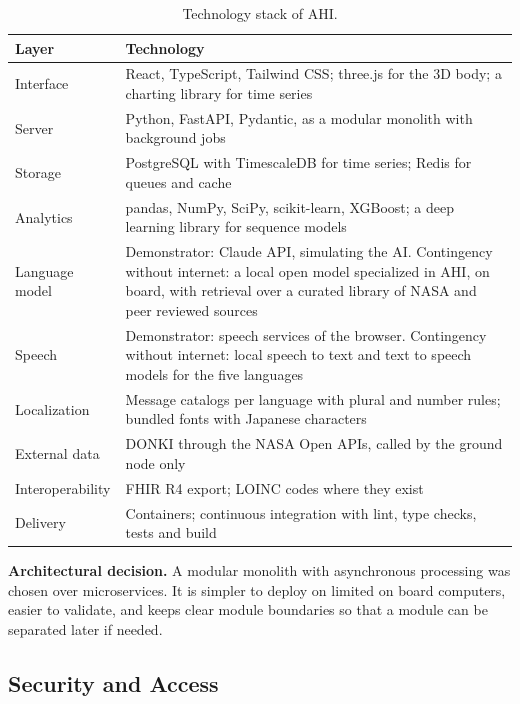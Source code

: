 \begin{table}[htbp]
\centering
\vspace{0.8em}
\caption{Technology stack of AHI.}
\label{tab:stack}
\small
\begin{tabular}{p{3.4cm}p{10.6cm}}
\hline
\textbf{Layer} & \textbf{Technology} \\
\hline
Interface & React, TypeScript, Tailwind CSS; three.js for the 3D body; a charting library for time series \\
Server & Python, FastAPI, Pydantic, as a modular monolith with background jobs \\
Storage & PostgreSQL with TimescaleDB for time series; Redis for queues and cache \\
Analytics & pandas, NumPy, SciPy, scikit-learn, XGBoost; a deep learning library for sequence models \\
Language model & Demonstrator: Claude API, simulating the AI. Contingency without internet: a local open model specialized in AHI, on board, with retrieval over a curated library of NASA and peer reviewed sources \\
Speech & Demonstrator: speech services of the browser. Contingency without internet: local speech to text and text to speech models for the five languages \\
Localization & Message catalogs per language with plural and number rules; bundled fonts with Japanese characters \\
External data & DONKI through the NASA Open APIs, called by the ground node only \\
Interoperability & FHIR R4 export; LOINC codes where they exist \\
Delivery & Containers; continuous integration with lint, type checks, tests and build \\
\hline
\end{tabular}
\vspace{1.2em}
\end{table}

\medskip\noindent\textbf{Architectural decision.} A modular monolith with asynchronous processing was chosen over microservices. It is simpler to deploy on limited on board computers, easier to validate, and keeps clear module boundaries so that a module can be separated later if needed.

\subsection{Security and Access}
\label{subsec:security}

